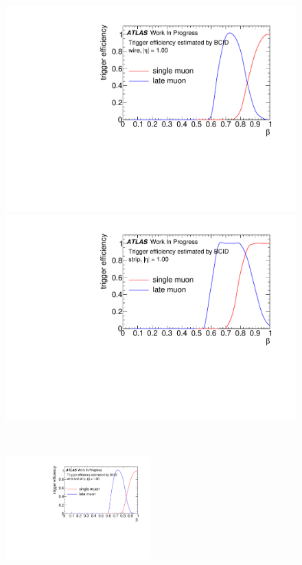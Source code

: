 \begin{figure}[H]
    \begin{minipage}{0.49\hsize}
    \centering   
    \includegraphics[width=\textwidth,page=2]{img/rec/eff_wire.pdf}
    \subcaption{}
    \end{minipage}
    \begin{minipage}{0.49\hsize}
    \centering   
    \includegraphics[width=\textwidth,page=2]{img/rec/eff_strip.pdf}
    \subcaption{}
    \end{minipage} \\
    \begin{minipage}{0.99\hsize}
    \centering   
    \includegraphics[width=0.5\textwidth,page=2]{img/rec/eff_both.pdf}

\end{minipage}
\end{figure}
